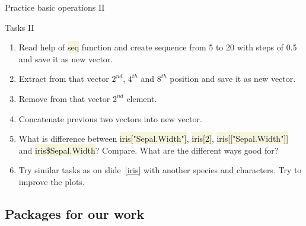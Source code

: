 \documentclass[compress, xelatex, 11pt, xcolor=svgnames, aspectratio=169, url={hyphens, lowtilde}]{beamer}
\renewcommand{\texttt}[1]{\colorbox{Beige}{{\ttfamily #1}}}
\begin{document}
\begin{frame}{Practice basic operations II}
	\begin{exampleblock}{Tasks II}
		\begin{enumerate}
			\item Read help of \texttt{seq} function and create sequence from 5 to 20 with steps of 0.5 and save it as new vector.
			\item Extract from that vector $2^{nd}$, $4^{th}$ and $8^{th}$ position and save it as new vector.
			\item Remove from that vector $2^{nd}$ element.
			\item Concatenate previous two vectors into new vector.
			\item What is difference between \texttt{iris["Sepal.Width"]}, \texttt{iris[2]}, \texttt{iris[["Sepal.Width"]]} and \texttt{iris\$Sepal.Width}? Compare. What are the different ways good for?
			\item Try similar tasks as on slide~\ref{iris} with another species and characters. Try to improve the plots.
		\end{enumerate}
	\end{exampleblock}
\end{frame}

\subsection{Packages for our work}
\end{document}
